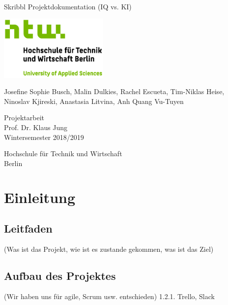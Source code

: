 \documentclass[11pt]{article}
\begin{document}
\begin{titlepage}
   \begin{center}
       \vspace*{1cm}

       \Huge
       Skribbl Projektdokumentation (IQ vs. KI)
       \vspace{2.0cm}

       \includegraphics[width=0.4\textwidth]{logo.jpg}

       \vspace{1.5cm}
       \LARGE

       Josefine Sophie Busch, Malin Dulkies, Rachel Escueta, Tim-Niklas Heise, Ninoslav Kjireski, Anastasia Litvina, Anh Quang Vu-Tuyen

       \vfill

       Projektarbeit \\
       Prof. Dr. Klaus Jung\\
       Wintersemester 2018/2019\\

       \vspace{0.8cm}

       Hochschule für Technik und Wirtschaft\\
       Berlin\\

   \end{center}
\end{titlepage}

\pagebreak
\tableofcontents
\pagebreak
\listoftables
\listoffigures
\pagebreak

\section{Einleitung}
\subsection{Leitfaden}

 (Was ist das Projekt, wie ist es zustande gekommen, was ist das Ziel)
\subsection{Aufbau des Projektes}
 (Wir haben uns für agile, Scrum usw. entschieden)    1.2.1. Trello, Slack
\end{document}
